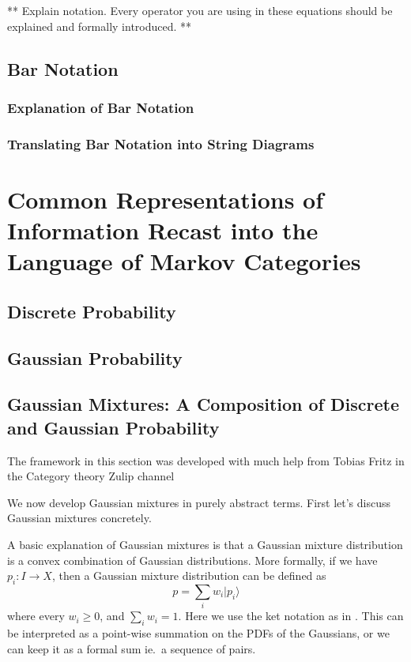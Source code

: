 ** Explain notation. Every operator you are using in these equations should be explained and formally introduced. **

\section{Bar Notation}
\subsection{Explanation of Bar Notation}
\subsection{Translating Bar Notation into String Diagrams}

\chapter{Common Representations of Information Recast into the Language of Markov Categories}
\section{Discrete Probability}
\section{Gaussian Probability}
\section{Gaussian Mixtures: A Composition of Discrete and Gaussian Probability}

The framework in this section was developed with much help from Tobias Fritz in the Category theory Zulip channel \cite{zulip}

We now develop Gaussian mixtures in purely abstract terms.
First let's discuss Gaussian mixtures concretely.

A basic explanation of Gaussian mixtures is that a Gaussian mixture distribution is a convex combination of Gaussian distributions.
More formally, if we have $p_i: I\rightarrow X$, then a Gaussian mixture distribution can be defined as
\begin{equation}
    p = \sum_i w_i | p_i \rangle
\end{equation}
where every $w_i \geq 0$, and $\sum_i w_i = 1$.
Here we use the ket notation as in \cite{cho-jacobs}.
This can be interpreted as a point-wise summation on the PDFs of the Gaussians, or we can keep it as a formal sum ie.\ a sequence of pairs.

